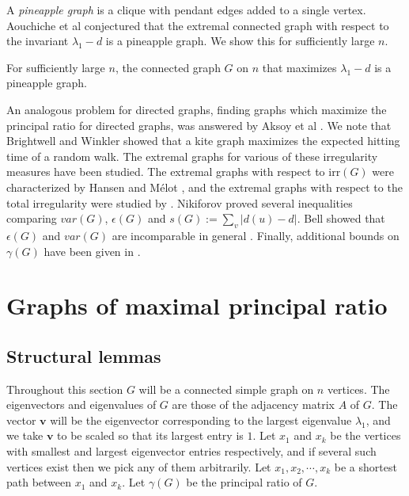 A \textit{pineapple graph} is a clique with pendant edges added to a single vertex.
Aouchiche et al \cite{AouchicheEtAl2008} conjectured that the extremal connected
graph with respect to the invariant $\lambda_1 - d$ is a pineapple graph.  We
show this for sufficiently large $n$.
\begin{theorem}
  For sufficiently large $n$, the connected graph $G$ on $n$
  that maximizes $\lambda_1 - d$ is a pineapple graph.
\end{theorem}



An analogous problem for directed graphs, finding graphs which maximize the
principal ratio for directed graphs, was answered by Aksoy et al \cite{AksoyEtAl2016}.
We note that Brightwell and Winkler \cite{BrightwellWinkler1990} showed that
a kite graph maximizes the expected hitting time of a random walk.
The extremal graphs for various of these irregularity measures have been
studied.  
The extremal graphs with respect to $\textrm{irr}(G)$
were characterized by Hansen and M\'elot \cite{HansenMelot2002},
and the extremal graphs with respect to the total irregularity
were studied by \cite{Abdo2014}.
Nikiforov \cite{Nikiforov2006} proved several inequalities comparing
$var(G)$, $\epsilon(G)$ and $s(G) := \sum_v |d(u) - d|$.  
Bell showed that $\epsilon(G)$ and $var(G)$ are incomparable in general
\cite{Bell1992}.  Finally, additional bounds on $\gamma(G)$ have been given in
\cite{CioabaGregory2007, PapendieckRecht2000, Minc1970, Latham1995, Zhang2005}.


\section{Graphs of maximal principal ratio}

\subsection{Structural lemmas}

Throughout this section $G$ will be a connected simple graph on $n$ vertices.
The eigenvectors and eigenvalues of $G$ are those of the adjacency
matrix $A$ of $G$.  The vector $\mathbf{v}$ will be the eigenvector corresponding
to the largest eigenvalue $\lambda_1$,  and we take $\mathbf{v}$ to be scaled
so that its largest entry is $1$.  Let $x_1$ and $x_k$
be the vertices with smallest and largest eigenvector entries respectively, and
if several such vertices exist then we pick any of them arbitrarily.
Let $x_1, x_2, \cdots, x_k$ be a shortest path between $x_1$ and
$x_k$.  Let $\gamma(G)$ be the principal ratio of $G$.



